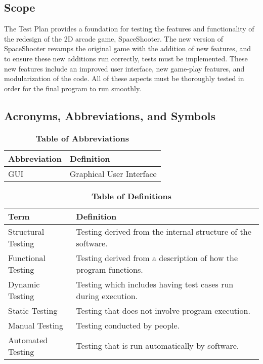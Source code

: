 \documentclass[12pt, titlepage]{article}
\begin{document}
\subsection{Scope}

The Test Plan provides a foundation for testing the features and functionality of the redesign of the 2D arcade game, SpaceShooter. The new version of SpaceShooter revamps the original game with the addition of new features, and to ensure these new additions run correctly, tests must be implemented. These new features include an improved user interface, new game-play features, and modularization of the code. All of these aspects must be thoroughly tested in order for the final program to run smoothly. 

\subsection{Acronyms, Abbreviations, and Symbols}
	
\begin{table}[hbp]
\caption{\textbf{Table of Abbreviations}} \label{Table}

\begin{tabularx}{\textwidth}{p{3cm}X}
\toprule
\textbf{Abbreviation} & \textbf{Definition} \\
\midrule
GUI & Graphical User Interface\\
\bottomrule
\end{tabularx}

\end{table}

\begin{table}[!htbp]
\caption{\textbf{Table of Definitions}} \label{Table}

\begin{tabularx}{\textwidth}{p{3.5cm}X}
\toprule
\textbf{Term} & \textbf{Definition}\\
\midrule
Structural Testing & Testing derived from the internal structure of the software.\\
Functional Testing & Testing derived from a description of how the program functions.\\
Dynamic Testing & Testing which includes having test cases run during execution.\\
Static Testing & Testing that does not involve program execution.\\
Manual Testing & Testing conducted by people.\\
Automated Testing & Testing that is run automatically by software.\\
\bottomrule
\end{tabularx}

\end{table}	
\end{document}
